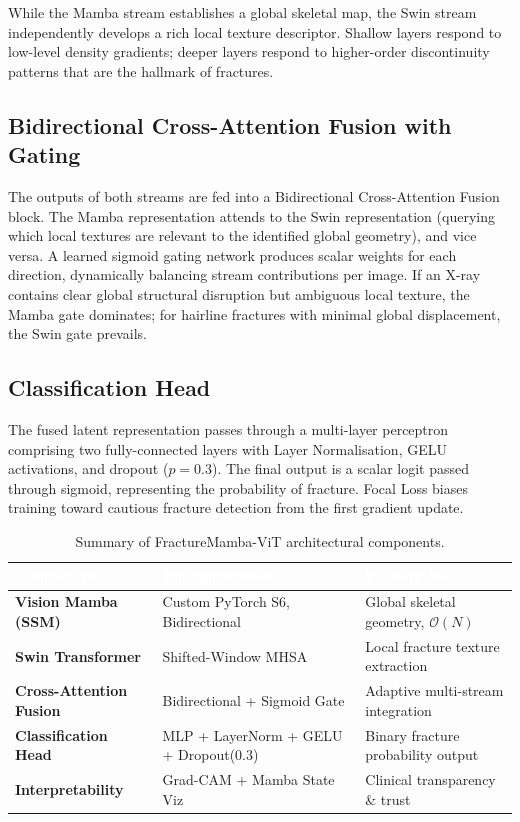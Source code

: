 \documentclass[12pt, a4paper]{article}
\begin{document}
While the Mamba stream establishes a global skeletal map, the Swin stream independently develops
a rich local texture descriptor. Shallow layers respond to low-level density gradients; deeper
layers respond to higher-order discontinuity patterns that are the hallmark of fractures.

\subsection{Bidirectional Cross-Attention Fusion with Gating}

The outputs of both streams are fed into a Bidirectional Cross-Attention Fusion block. The Mamba
representation attends to the Swin representation (querying which local textures are relevant to
the identified global geometry), and vice versa. A learned sigmoid gating network produces scalar
weights for each direction, dynamically balancing stream contributions per image. If an X-ray
contains clear global structural disruption but ambiguous local texture, the Mamba gate dominates;
for hairline fractures with minimal global displacement, the Swin gate prevails.

\subsection{Classification Head}

The fused latent representation passes through a multi-layer perceptron comprising two
fully-connected layers with Layer Normalisation, GELU activations, and dropout ($p=0.3$). The
final output is a scalar logit passed through sigmoid, representing the probability of fracture.
Focal Loss biases training toward cautious fracture detection from the first gradient update.

\vspace{0.5em}

\begin{table}[H]
\centering
\caption{Summary of FractureMamba-ViT architectural components.}
\label{tab:architecture}
\begin{tabularx}{\textwidth}{>{\bfseries}lXX}
\toprule
\rowcolor{NavyBlue}
\textcolor{white}{Component} &
\textcolor{white}{Implementation} &
\textcolor{white}{Primary Role} \\
\midrule
Vision Mamba (SSM)      & Custom PyTorch S6, Bidirectional      & Global skeletal geometry, $\mathcal{O}(N)$ \\
Swin Transformer        & Shifted-Window MHSA                   & Local fracture texture extraction \\
Cross-Attention Fusion  & Bidirectional + Sigmoid Gate          & Adaptive multi-stream integration \\
Classification Head     & MLP + LayerNorm + GELU + Dropout(0.3) & Binary fracture probability output \\
Interpretability        & Grad-CAM + Mamba State Viz            & Clinical transparency \& trust \\
\bottomrule
\end{tabularx}
\end{table}
\end{document}
